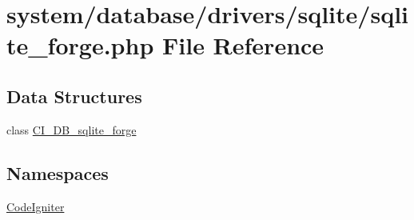 \hypertarget{sqlite__forge_8php}{}\section{system/database/drivers/sqlite/sqlite\+\_\+forge.php File Reference}
\label{sqlite__forge_8php}
\subsection*{Data Structures}
\begin{DoxyCompactItemize}
\item 
class \mbox{\hyperlink{class_c_i___d_b__sqlite__forge}{C\+I\+\_\+\+D\+B\+\_\+sqlite\+\_\+forge}}
\end{DoxyCompactItemize}
\subsection*{Namespaces}
\begin{DoxyCompactItemize}
\item 
 \mbox{\hyperlink{namespace_code_igniter}{Code\+Igniter}}
\end{DoxyCompactItemize}
